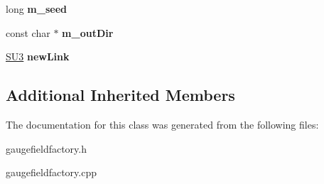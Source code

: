\begin{DoxyCompactItemize}
\item 
long {\bfseries m\+\_\+seed}\hypertarget{classGaugeFieldFactory_a56f0e062cd0cb3d73b487891ccb67462}{}\label{classGaugeFieldFactory_a56f0e062cd0cb3d73b487891ccb67462}

\item 
const char $\ast$ {\bfseries m\+\_\+out\+Dir}\hypertarget{classGaugeFieldFactory_ad231575f1bf834b20ff5e948331b748c}{}\label{classGaugeFieldFactory_ad231575f1bf834b20ff5e948331b748c}

\item 
\hyperlink{structSU3}{S\+U3} {\bfseries new\+Link}\hypertarget{classGaugeFieldFactory_af15971c810e2e4cee7de71e9560b16fc}{}\label{classGaugeFieldFactory_af15971c810e2e4cee7de71e9560b16fc}

\end{DoxyCompactItemize}
\subsection*{Additional Inherited Members}


The documentation for this class was generated from the following files\+:\begin{DoxyCompactItemize}
\item 
gaugefieldfactory.\+h\item 
gaugefieldfactory.\+cpp\end{DoxyCompactItemize}
